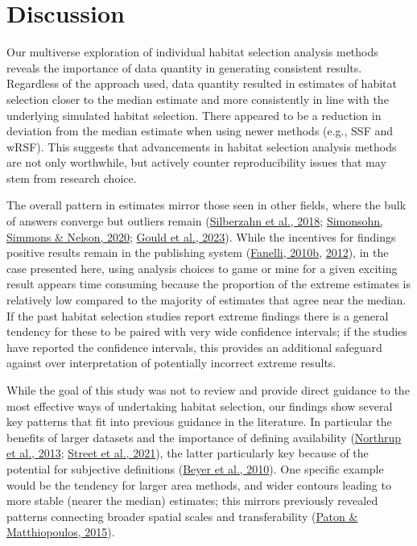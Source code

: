 \documentclass[10pt,a4paper]{article}
\begin{document}
\hypertarget{discussion}{%
\section{Discussion}\label{discussion}}

Our multiverse exploration of individual habitat selection analysis methods reveals the importance of data quantity in generating consistent results.
Regardless of the approach used, data quantity resulted in estimates of habitat selection closer to the median estimate and more consistently in line with the underlying simulated habitat selection.
There appeared to be a reduction in deviation from the median estimate when using newer methods (e.g., SSF and wRSF).
This suggests that advancements in habitat selection analysis methods are not only worthwhile, but actively counter reproducibility issues that may stem from research choice.

The overall pattern in estimates mirror those seen in other fields, where the bulk of answers converge but outliers remain (\protect\hyperlink{ref-silberzahn_many_2018}{Silberzahn et al., 2018}; \protect\hyperlink{ref-simonsohn_specification_2020}{Simonsohn, Simmons \& Nelson, 2020}; \protect\hyperlink{ref-gould_same_2023}{Gould et al., 2023}).
While the incentives for findings positive results remain in the publishing system (\protect\hyperlink{ref-fanelli_positive_2010}{Fanelli, 2010b}, \protect\hyperlink{ref-fanelli_negative_2012}{2012}), in the case presented here, using analysis choices to game or mine for a given exciting result appears time consuming because the proportion of the extreme estimates is relatively low compared to the majority of estimates that agree near the median.
If the past habitat selection studies report extreme findings there is a general tendency for these to be paired with very wide confidence intervals; if the studies have reported the confidence intervals, this provides an additional safeguard against over interpretation of potentially incorrect extreme results.

While the goal of this study was not to review and provide direct guidance to the most effective ways of undertaking habitat selection, our findings show several key patterns that fit into previous guidance in the literature.
In particular the benefits of larger datasets and the importance of defining availability (\protect\hyperlink{ref-northrup_practical_2013}{Northrup et al., 2013}; \protect\hyperlink{ref-street_solving_2021}{Street et al., 2021}), the latter particularly key because of the potential for subjective definitions (\protect\hyperlink{ref-beyer_interpretation_2010}{Beyer et al., 2010}).
One specific example would be the tendency for larger area methods, and wider contours leading to more stable (nearer the median) estimates; this mirrors previously revealed patterns connecting broader spatial scales and transferability (\protect\hyperlink{ref-paton_defining_2015}{Paton \& Matthiopoulos, 2015}).
\end{document}
